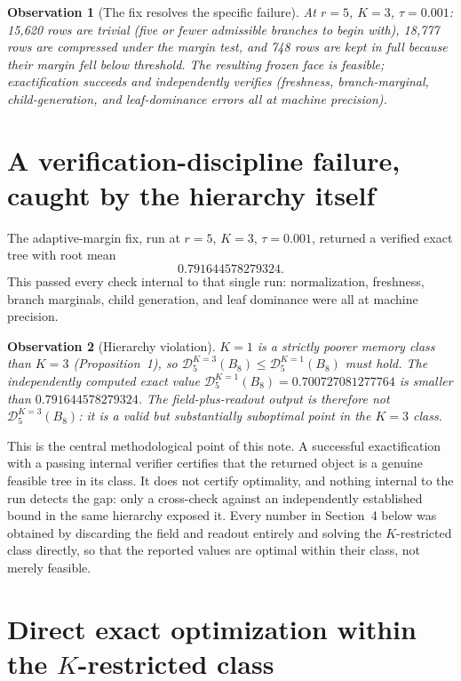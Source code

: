 \documentclass[11pt,a4paper]{article}
\newtheorem{observation}{Observation}
\newcommand{\D}{\mathscr D}
\begin{document}
\begin{observation}[The fix resolves the specific failure]
At $r=5$, $K=3$, $\tau=0.001$: 15{,}620 rows are trivial (five or fewer
admissible branches to begin with), 18{,}777 rows are compressed under the
margin test, and 748 rows are kept in full because their margin fell below
threshold. The resulting frozen face is feasible; exactification succeeds and
independently verifies (freshness, branch-marginal, child-generation, and
leaf-dominance errors all at machine precision).
\end{observation}

\section{A verification-discipline failure, caught by the hierarchy itself}

The adaptive-margin fix, run at $r=5$, $K=3$, $\tau=0.001$, returned a
verified exact tree with root mean
\[
0.791644578279324.
\]
This passed every check internal to that single run: normalization,
freshness, branch marginals, child generation, and leaf dominance were all at
machine precision.

\begin{observation}[Hierarchy violation]
$K=1$ is a strictly poorer memory class than $K=3$ (Proposition~1), so
$\D_5^{K=3}(B_8) \le \D_5^{K=1}(B_8)$ must hold. The independently computed
exact value $\D_5^{K=1}(B_8) = 0.700727081277764$ is smaller than
$0.791644578279324$. The field-plus-readout output is therefore \emph{not}
$\D_5^{K=3}(B_8)$: it is a valid but substantially suboptimal point in the
$K=3$ class.
\end{observation}

This is the central methodological point of this note. A successful
exactification with a passing internal verifier certifies that the returned
object is a genuine feasible tree in its class. It does not certify
optimality, and nothing internal to the run detects the gap: only a
cross-check against an independently established bound in the same
hierarchy exposed it. Every number in Section~4 below was obtained by
discarding the field and readout entirely and solving the $K$-restricted
class directly, so that the reported values are optimal within their class,
not merely feasible.

\section{Direct exact optimization within the \texorpdfstring{$K$}{K}-restricted class}
\end{document}
